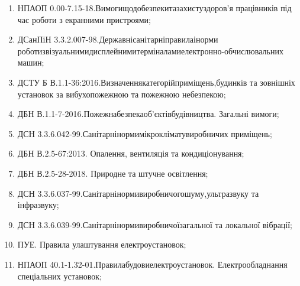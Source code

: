 \begin{enumerate}
	\item НПАОП 0.00-7.15-18.\hfill Вимоги\hfill щодо\hfill безпеки\hfill та\hfill захисту\hfill здоров’я\newline \hspace*{-20mm} працівників під час роботи з екранними пристроями;
	\item ДСанПіН 3.3.2.007-98.\hfill Державні\hfill санітарні\hfill правила\hfill і\hfill норми\newline \hspace*{-20mm} роботи\hfill з\hfill візуальними\hfill дисплейними\hfill терміналами\hfill електронно-\newline \hspace*{-18mm}обчислювальних машин;
	\item ДСТУ Б В.1.1-36:2016.\hfill Визначення\hfill категорій\hfill приміщень,\hfill будинків\newline \hspace*{-18mm} та зовнішніх установок за вибухопожежною та пожежною небезпекою;
	\item ДБН В.1.1-7-2016.\hfill Пожежна\hfill безпека\hfill об’єктів\hfill будівництва.\newline \hspace*{-18mm} Загальні вимоги;
	\item ДСН 3.3.6.042-99.\hfill Санітарні\hfill норми\hfill мікроклімату\hfill виробничих\newline \hspace*{-18mm} приміщень;
	\item ДБН В.2.5-67:2013. Опалення, вентиляція та кондиціонування;
	\item ДБН В.2.5-28-2018. Природне та штучне освітлення;
	\item ДСН 3.3.6.037-99.\hfill Санітарні\hfill норми\hfill виробничого\hfill шуму,\hfill ультразвуку\newline \hspace*{-18mm} та інфразвуку;
	\item ДСН 3.3.6.039-99.\hfill Санітарні\hfill норми\hfill виробничої\hfill загальної\newline \hspace*{-18mm} та локальної вібрації;
	\item ПУЕ. Правила улаштування електроустановок;
	\item НПАОП 40.1-1.32-01.\hfill Правила\hfill будови\hfill електроустановок.\newline \hspace*{-18mm} Електрообладнання спеціальних установок;

\end{enumerate}
